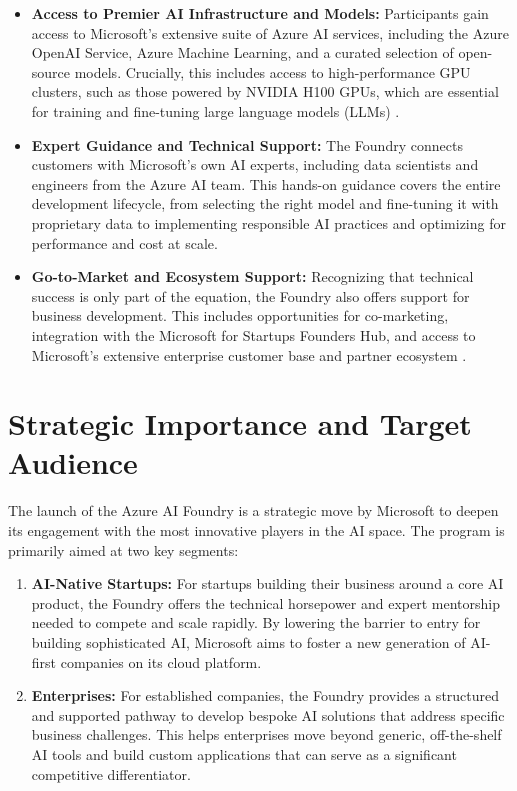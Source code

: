 \documentclass[12pt, a4paper]{article}
\begin{document}
\begin{itemize}
    \item \textbf{Access to Premier AI Infrastructure and Models:} Participants gain access to Microsoft's extensive suite of Azure AI services, including the Azure OpenAI Service, Azure Machine Learning, and a curated selection of open-source models. Crucially, this includes access to high-performance GPU clusters, such as those powered by NVIDIA H100 GPUs, which are essential for training and fine-tuning large language models (LLMs) \cite{TechCrunchFoundry}.
    
    \item \textbf{Expert Guidance and Technical Support:} The Foundry connects customers with Microsoft's own AI experts, including data scientists and engineers from the Azure AI team. This hands-on guidance covers the entire development lifecycle, from selecting the right model and fine-tuning it with proprietary data to implementing responsible AI practices and optimizing for performance and cost at scale.
    
    \item \textbf{Go-to-Market and Ecosystem Support:} Recognizing that technical success is only part of the equation, the Foundry also offers support for business development. This includes opportunities for co-marketing, integration with the Microsoft for Startups Founders Hub, and access to Microsoft's extensive enterprise customer base and partner ecosystem \cite{VentureBeatFoundry}.
\end{itemize}

\section{Strategic Importance and Target Audience}
The launch of the Azure AI Foundry is a strategic move by Microsoft to deepen its engagement with the most innovative players in the AI space. The program is primarily aimed at two key segments:

\begin{enumerate}
    \item \textbf{AI-Native Startups:} For startups building their business around a core AI product, the Foundry offers the technical horsepower and expert mentorship needed to compete and scale rapidly. By lowering the barrier to entry for building sophisticated AI, Microsoft aims to foster a new generation of AI-first companies on its cloud platform.
    
    \item \textbf{Enterprises:} For established companies, the Foundry provides a structured and supported pathway to develop bespoke AI solutions that address specific business challenges. This helps enterprises move beyond generic, off-the-shelf AI tools and build custom applications that can serve as a significant competitive differentiator.
\end{enumerate}
\end{document}
